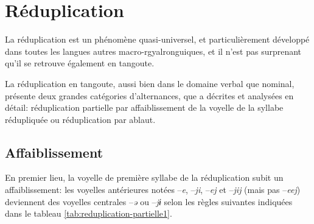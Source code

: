 \documentclass[oldfontcommands,twoside,a4paper,11pt,draft]{memoir}
\begin{document}
\section{Réduplication} 
La réduplication est un phénomène quasi-universel, et particulièrement développé dans toutes les langues autres macro-rgyalronguiques, et il n'est pas surprenant qu'il se retrouve également en tangoute.

 

La réduplication en tangoute, aussi bien dans le domaine verbal que nominal, présente deux grandes catégories d'alternances, que \citet{gong97chongdie} a décrites et analysées en détail: réduplication partielle par affaiblissement de la voyelle de la syllabe rédupliquée ou réduplication par ablaut.
\subsection{Affaiblissement} \label{subsec:redp-alt}
En premier lieu, la voyelle de première syllabe de la réduplication subit un affaiblissement: les voyelles antérieures notées --\textit{e}, --\textit{ji}, --\textit{ej} et --\textit{jij} (mais pas --\textit{eej}) deviennent des voyelles centrales --\textit{ə} ou --\textit{jɨ} selon les règles suivantes indiquées dans le tableau \ref{tab:reduplication-partielle1}.
\end{document}

